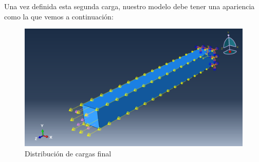 \documentclass[spanish,a4paper,12pt]{article}
\begin{document}
Una vez definida esta segunda carga, nuestro modelo debe tener una apariencia como la que vemos a continuación:

\begin{figure}[h!tp]
\centering
\includegraphics[scale=0.38]{capturas/load8.png}
\caption{Distribución de cargas final}
\label{fig:load6}
\end{figure}

\clearpage
\end{document}
